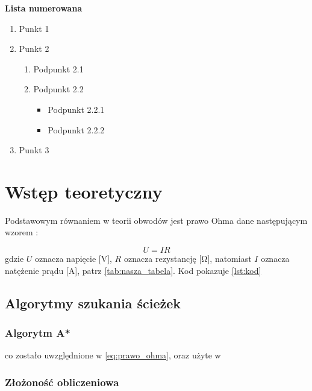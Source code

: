 \noindent \textbf{Lista numerowana}

\begin{enumerate}
    \item Punkt 1
    \item Punkt 2
    \begin{enumerate}
        \item Podpunkt 2.1
        \item Podpunkt 2.2
        \begin{itemize}
            \item Podpunkt 2.2.1
            \item Podpunkt 2.2.2
        \end{itemize}
    \end{enumerate}
    \item Punkt 3
\end{enumerate}

\section{Wstęp teoretyczny}

Podstawowym równaniem w teorii obwodów jest prawo Ohma dane następującym wzorem \cite{Now02}:

\begin{equation}
\label{eq:prawo_ohma}
U = I R    
\end{equation}
gdzie $U$ oznacza napięcie [\si{\volt}], $R$ oznacza rezystancję [\si{\ohm}], natomiast $I$ oznacza natężenie prądu [\si{\ampere}], patrz \cref{tab:nasza_tabela}. Kod pokazuje \cref{lst:kod}

\color{blue}
\subsection{Algorytmy szukania ścieżek}

\subsubsection{Algorytm A*}

co zostało uwzględnione w \cref{eq:prawo_ohma}, oraz użyte w \cite{Nat12,Bar04}

\subsubsection{Złożoność obliczeniowa} 

